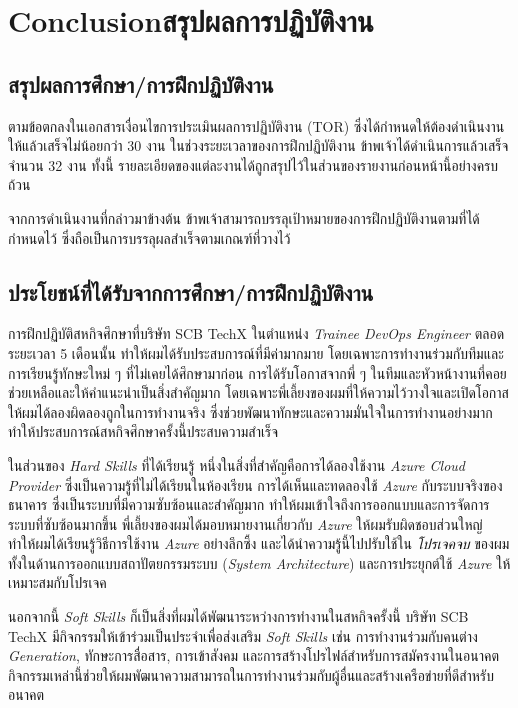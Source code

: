 \chapter{\ifenglish Conclusion\else สรุปผลการปฏิบัติงาน\fi}

\section{สรุปผลการศึกษา/การฝึกปฏิบัติงาน} ตามข้อตกลงในเอกสารเงื่อนไขการประเมินผลการปฏิบัติงาน (TOR) ซึ่งได้กำหนดให้ต้องดำเนินงานให้แล้วเสร็จไม่น้อยกว่า 30 งาน ในช่วงระยะเวลาของการฝึกปฏิบัติงาน ข้าพเจ้าได้ดำเนินการแล้วเสร็จจำนวน 32 งาน ทั้งนี้ รายละเอียดของแต่ละงานได้ถูกสรุปไว้ในส่วนของรายงานก่อนหน้านี้อย่างครบถ้วน

จากการดำเนินงานที่กล่าวมาข้างต้น ข้าพเจ้าสามารถบรรลุเป้าหมายของการฝึกปฏิบัติงานตามที่ได้กำหนดไว้ ซึ่งถือเป็นการบรรลุผลสำเร็จตามเกณฑ์ที่วางไว้

\section{ประโยชน์ที่ได้รับจากการศึกษา/การฝึกปฏิบัติงาน}
การฝึกปฏิบัติสหกิจศึกษาที่บริษัท SCB TechX ในตำแหน่ง \textit{Trainee DevOps Engineer} ตลอดระยะเวลา 5 เดือนนั้น ทำให้ผมได้รับประสบการณ์ที่มีค่ามากมาย โดยเฉพาะการทำงานร่วมกับทีมและการเรียนรู้ทักษะใหม่ ๆ ที่ไม่เคยได้ศึกษามาก่อน การได้รับโอกาสจากพี่ ๆ ในทีมและหัวหน้างานที่คอยช่วยเหลือและให้คำแนะนำเป็นสิ่งสำคัญมาก โดยเฉพาะพี่เลี้ยงของผมที่ให้ความไว้วางใจและเปิดโอกาสให้ผมได้ลองผิดลองถูกในการทำงานจริง ซึ่งช่วยพัฒนาทักษะและความมั่นใจในการทำงานอย่างมาก ทำให้ประสบการณ์สหกิจศึกษาครั้งนี้ประสบความสำเร็จ

ในส่วนของ \textit{Hard Skills} ที่ได้เรียนรู้ หนึ่งในสิ่งที่สำคัญคือการได้ลองใช้งาน \textit{Azure Cloud Provider} ซึ่งเป็นความรู้ที่ไม่ได้เรียนในห้องเรียน การได้เห็นและทดลองใช้ \textit{Azure} กับระบบจริงของธนาคาร ซึ่งเป็นระบบที่มีความซับซ้อนและสำคัญมาก ทำให้ผมเข้าใจถึงการออกแบบและการจัดการระบบที่ซับซ้อนมากขึ้น พี่เลี้ยงของผมได้มอบหมายงานเกี่ยวกับ \textit{Azure} ให้ผมรับผิดชอบส่วนใหญ่ ทำให้ผมได้เรียนรู้วิธีการใช้งาน \textit{Azure} อย่างลึกซึ้ง และได้นำความรู้นี้ไปปรับใช้ใน \textit{โปรเจคจบ} ของผม ทั้งในด้านการออกแบบสถาปัตยกรรมระบบ (\textit{System Architecture}) และการประยุกต์ใช้ \textit{Azure} ให้เหมาะสมกับโปรเจค

นอกจากนี้ \textit{Soft Skills} ก็เป็นสิ่งที่ผมได้พัฒนาระหว่างการทำงานในสหกิจครั้งนี้ บริษัท SCB TechX มีกิจกรรมให้เข้าร่วมเป็นประจำเพื่อส่งเสริม \textit{Soft Skills} เช่น การทำงานร่วมกับคนต่าง \textit{Generation}, ทักษะการสื่อสาร, การเข้าสังคม และการสร้างโปรไฟล์สำหรับการสมัครงานในอนาคต กิจกรรมเหล่านี้ช่วยให้ผมพัฒนาความสามารถในการทำงานร่วมกับผู้อื่นและสร้างเครือข่ายที่ดีสำหรับอนาคต

